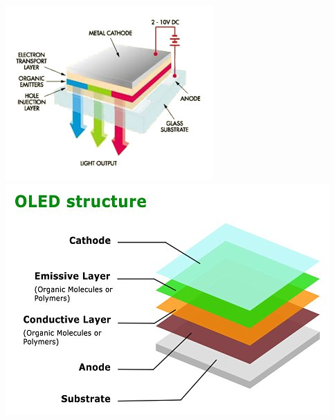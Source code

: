 \documentclass{beamer}
\newcommand{\fullPageImage}[2]{
	{
		\usebackgroundtemplate{\texttt{[image: \#1]}}
		\frame[plain]{#2}
	}
}
\begin{document}
\begin{frame}
\begin{columns}
	\includegraphics[width=.9\textwidth, height=.3\textheight]{images/whatisoled.jpg}\\ %
	\includegraphics[width=.9\textwidth, height=.3\textheight]{images/oled-structure.jpg} %
	\end{columns}
\end{frame}

\fullPageImage{images/flexible-oled.jpg}{\transwipe}
\fullPageImage{images/flexible-oled-display.jpg}{\transwipe} %
\end{document}

